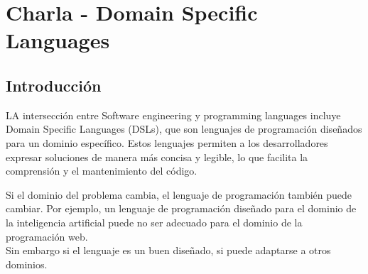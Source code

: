 \chapter{Charla - Domain Specific Languages}

\section{Introducción}
LA intersección entre Software engineering y programming languages incluye Domain Specific Languages (DSLs), que son lenguajes de programación diseñados para un dominio específico. Estos lenguajes permiten a los desarrolladores expresar soluciones de manera más concisa y legible, lo que facilita la comprensión y el mantenimiento del código.

Si el dominio del problema cambia, el lenguaje de programación también puede cambiar. Por ejemplo, un lenguaje de programación diseñado para el dominio de la inteligencia artificial puede no ser adecuado para el dominio de la programación web.\\
Sin embargo si el lenguaje es un buen diseñado, si puede adaptarse a otros dominios.